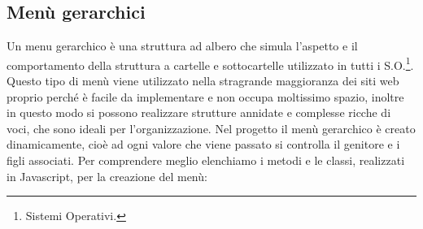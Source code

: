 \documentclass[a4paper,11pt]{article}
\begin{document}
\subsection{Menù gerarchici}
\label{sec:5.1}
Un menu gerarchico è una struttura ad albero che simula l'aspetto e il comportamento della struttura a cartelle e sottocartelle utilizzato in tutti i S.O.\footnote{Sistemi Operativi.}. Questo tipo di menù viene utilizzato nella stragrande maggioranza dei siti web proprio perché è facile da implementare e non occupa moltissimo spazio, inoltre in questo modo si possono realizzare strutture annidate e complesse ricche di voci, che sono ideali per l'organizzazione.\newline 
Nel progetto il menù gerarchico è creato dinamicamente, cioè ad ogni valore che viene passato si controlla il genitore e i figli associati.
Per comprendere meglio elenchiamo i metodi e le classi, realizzati in Javascript, per la creazione del menù:
\end{document}
